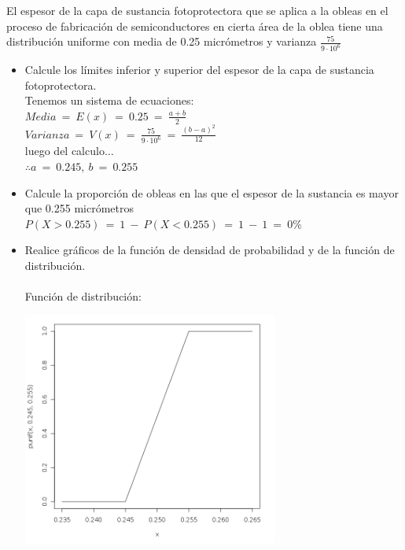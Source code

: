 %
%

El espesor de la capa de sustancia fotoprotectora que se aplica a la obleas en el proceso de fabricaci\'on de semiconductores en
cierta \'area de la oblea tiene una distribuci\'on uniforme con media de 0.25 micr\'ometros y varianza $\frac{75}{9\cdot 10^{6}}$
% 
\begin{itemize}
	\item Calcule los l\'imites inferior y superior del espesor de la capa de sustancia fotoprotectora.\\
		Tenemos un sistema de ecuaciones:\\
		$Media\ =\ E(x)\ =\ 0.25\ =\ \frac{a+b}{2}$\\
		$Varianza\ =\ V(x)\ =\ \frac{75}{9\cdot 10^{6}}\ =\ \frac{(b-a)^2}{12}$\\
		luego del calculo$\ldots$\\
		$\therefore a\ =\ 0.245,\ b\ =\ 0.255$\\
	\item Calcule la proporci\'on de obleas en las que el espesor de la sustancia es mayor que 0.255 micr\'ometros\\
		$P(X>0.255)\ =\ 1\ -\ P(X<0.255)\ =\ 1\ -\ 1\ =\ 0\%$\\ %
	\item Realice gr\'aficos de la funci\'on de densidad de probabilidad y de la funci\'on de distribuci\'on.\\
		\\
		Funci\'on de distribuci\'on:\\
	  	  \includegraphics[width=3.3in,height=3.3in]{images/2_1-punif.png}\\

\end{itemize}
